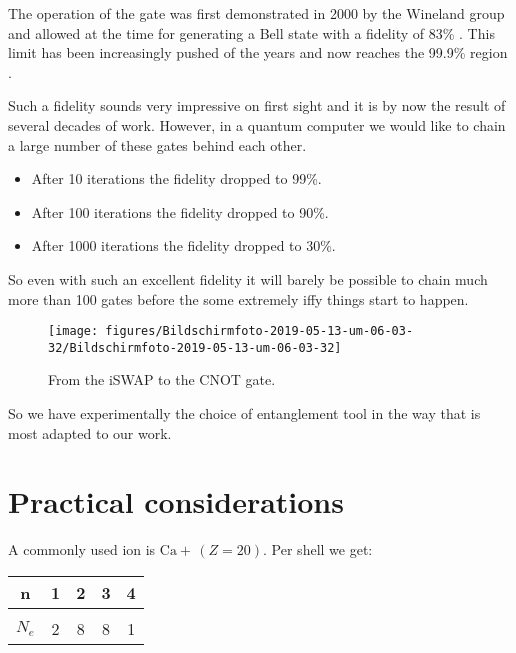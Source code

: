 \documentclass[10pt]{article}
\let\cite\citep
\providecommand\citep{\cite}
\newcommand*\ch[1]{\ensuremath{\mathrm{#1}}}
\begin{document}
The operation of the gate was first demonstrated in 2000 by the Wineland group and allowed at the time for generating a Bell state with a fidelity of 83\% \cite{Sackett_2000}. This limit has been increasingly pushed of the years and now reaches the 99.9\% region \cite{Benhelm_2008,Gaebler_2016,Ballance_2016}. 

Such a fidelity sounds very impressive on first sight and it is by now the result of several decades of work. However, in a quantum computer we would like to chain a large number of these gates behind each other.
\begin{itemize}
\item After 10 iterations the fidelity dropped to 99\%.
\item After 100 iterations the fidelity dropped to 90\%.
\item After 1000 iterations the fidelity dropped to 30\%.
\end{itemize}
So even with such an excellent fidelity it will barely be possible to chain much more than 100 gates before the some extremely iffy things start to happen.
\begin{figure}[h!]
\begin{center}
\texttt{[image: figures/Bildschirmfoto-2019-05-13-um-06-03-32/Bildschirmfoto-2019-05-13-um-06-03-32]}
\caption{{From the iSWAP to the CNOT gate.
{\label{483914}}%
}}
\end{center}
\end{figure}

So we have experimentally the choice of entanglement tool in the way that is most adapted to our work.



\section{Practical considerations}

A commonly used ion is $\ch{Ca+} \, (Z=20)$. Per shell we get:

\begin{tabular}{c|cccc}
n & 1 & 2 & 3 & 4\\
\hline \\
$N_{e}$ & 2 & 8 & 8 & 1
\end{tabular}
\end{document}

